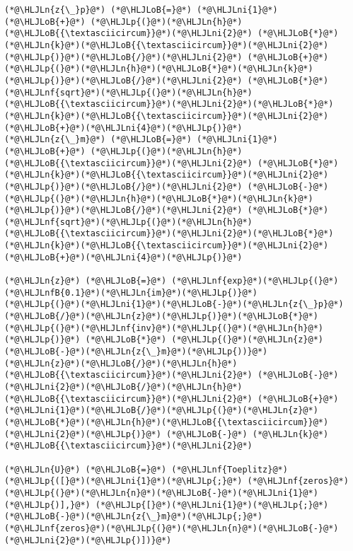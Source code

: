 \documentclass[12pt,a4paper]{article}
\newcommand{\HLJLn}[1]{#1}
\newcommand{\HLJLnf}[1]{\textcolor[RGB]{66,102,213}{#1}}
\newcommand{\HLJLnfB}[1]{\textcolor[RGB]{59,151,46}{#1}}
\newcommand{\HLJLni}[1]{\textcolor[RGB]{59,151,46}{#1}}
\newcommand{\HLJLoB}[1]{\textcolor[RGB]{102,102,102}{\textbf{#1}}}
\newcommand{\HLJLp}[1]{#1}
\begin{document}
\begin{lstlisting}
(*@\HLJLn{z{\_}p}@*) (*@\HLJLoB{=}@*) (*@\HLJLni{1}@*) (*@\HLJLoB{+}@*) (*@\HLJLp{(}@*)(*@\HLJLn{h}@*)(*@\HLJLoB{{\textasciicircum}}@*)(*@\HLJLni{2}@*) (*@\HLJLoB{*}@*) (*@\HLJLn{k}@*)(*@\HLJLoB{{\textasciicircum}}@*)(*@\HLJLni{2}@*)(*@\HLJLp{)}@*)(*@\HLJLoB{/}@*)(*@\HLJLni{2}@*) (*@\HLJLoB{+}@*) (*@\HLJLp{(}@*)(*@\HLJLn{h}@*)(*@\HLJLoB{*}@*)(*@\HLJLn{k}@*)(*@\HLJLp{)}@*)(*@\HLJLoB{/}@*)(*@\HLJLni{2}@*) (*@\HLJLoB{*}@*) (*@\HLJLnf{sqrt}@*)(*@\HLJLp{(}@*)(*@\HLJLn{h}@*)(*@\HLJLoB{{\textasciicircum}}@*)(*@\HLJLni{2}@*)(*@\HLJLoB{*}@*)(*@\HLJLn{k}@*)(*@\HLJLoB{{\textasciicircum}}@*)(*@\HLJLni{2}@*)(*@\HLJLoB{+}@*)(*@\HLJLni{4}@*)(*@\HLJLp{)}@*)
(*@\HLJLn{z{\_}m}@*) (*@\HLJLoB{=}@*) (*@\HLJLni{1}@*) (*@\HLJLoB{+}@*) (*@\HLJLp{(}@*)(*@\HLJLn{h}@*)(*@\HLJLoB{{\textasciicircum}}@*)(*@\HLJLni{2}@*) (*@\HLJLoB{*}@*) (*@\HLJLn{k}@*)(*@\HLJLoB{{\textasciicircum}}@*)(*@\HLJLni{2}@*)(*@\HLJLp{)}@*)(*@\HLJLoB{/}@*)(*@\HLJLni{2}@*) (*@\HLJLoB{-}@*) (*@\HLJLp{(}@*)(*@\HLJLn{h}@*)(*@\HLJLoB{*}@*)(*@\HLJLn{k}@*)(*@\HLJLp{)}@*)(*@\HLJLoB{/}@*)(*@\HLJLni{2}@*) (*@\HLJLoB{*}@*) (*@\HLJLnf{sqrt}@*)(*@\HLJLp{(}@*)(*@\HLJLn{h}@*)(*@\HLJLoB{{\textasciicircum}}@*)(*@\HLJLni{2}@*)(*@\HLJLoB{*}@*)(*@\HLJLn{k}@*)(*@\HLJLoB{{\textasciicircum}}@*)(*@\HLJLni{2}@*)(*@\HLJLoB{+}@*)(*@\HLJLni{4}@*)(*@\HLJLp{)}@*)

(*@\HLJLn{z}@*) (*@\HLJLoB{=}@*) (*@\HLJLnf{exp}@*)(*@\HLJLp{(}@*)(*@\HLJLnfB{0.1}@*)(*@\HLJLn{im}@*)(*@\HLJLp{)}@*)
(*@\HLJLp{(}@*)(*@\HLJLni{1}@*)(*@\HLJLoB{-}@*)(*@\HLJLn{z{\_}p}@*)(*@\HLJLoB{/}@*)(*@\HLJLn{z}@*)(*@\HLJLp{)}@*)(*@\HLJLoB{*}@*)(*@\HLJLp{(}@*)(*@\HLJLnf{inv}@*)(*@\HLJLp{(}@*)(*@\HLJLn{h}@*)(*@\HLJLp{)}@*) (*@\HLJLoB{*}@*) (*@\HLJLp{(}@*)(*@\HLJLn{z}@*)(*@\HLJLoB{-}@*)(*@\HLJLn{z{\_}m}@*)(*@\HLJLp{))}@*)
(*@\HLJLn{z}@*)(*@\HLJLoB{/}@*)(*@\HLJLn{h}@*)(*@\HLJLoB{{\textasciicircum}}@*)(*@\HLJLni{2}@*) (*@\HLJLoB{-}@*) (*@\HLJLni{2}@*)(*@\HLJLoB{/}@*)(*@\HLJLn{h}@*)(*@\HLJLoB{{\textasciicircum}}@*)(*@\HLJLni{2}@*) (*@\HLJLoB{+}@*) (*@\HLJLni{1}@*)(*@\HLJLoB{/}@*)(*@\HLJLp{(}@*)(*@\HLJLn{z}@*)(*@\HLJLoB{*}@*)(*@\HLJLn{h}@*)(*@\HLJLoB{{\textasciicircum}}@*)(*@\HLJLni{2}@*)(*@\HLJLp{)}@*) (*@\HLJLoB{-}@*) (*@\HLJLn{k}@*)(*@\HLJLoB{{\textasciicircum}}@*)(*@\HLJLni{2}@*)

(*@\HLJLn{U}@*) (*@\HLJLoB{=}@*) (*@\HLJLnf{Toeplitz}@*)(*@\HLJLp{([}@*)(*@\HLJLni{1}@*)(*@\HLJLp{;}@*) (*@\HLJLnf{zeros}@*)(*@\HLJLp{(}@*)(*@\HLJLn{n}@*)(*@\HLJLoB{-}@*)(*@\HLJLni{1}@*)(*@\HLJLp{)],}@*) (*@\HLJLp{[}@*)(*@\HLJLni{1}@*)(*@\HLJLp{;}@*) (*@\HLJLoB{-}@*)(*@\HLJLn{z{\_}m}@*)(*@\HLJLp{;}@*) (*@\HLJLnf{zeros}@*)(*@\HLJLp{(}@*)(*@\HLJLn{n}@*)(*@\HLJLoB{-}@*)(*@\HLJLni{2}@*)(*@\HLJLp{)])}@*)
\end{lstlisting}
\end{document}
